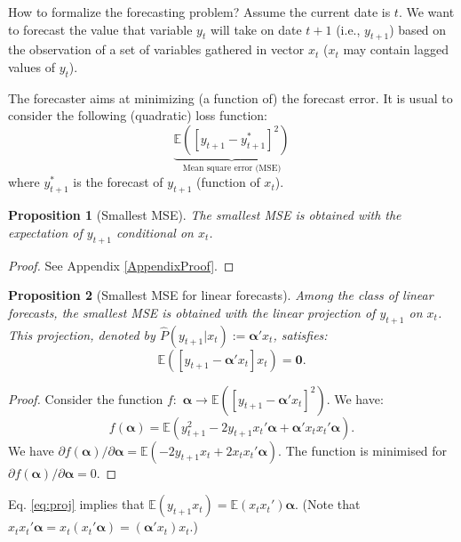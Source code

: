 \documentclass[
  11pt,
]{book}
\newtheorem{proposition}{Proposition}[chapter]
\theoremstyle{definition}
\theoremstyle{definition}
\theoremstyle{definition}
\theoremstyle{definition}
\theoremstyle{remark}
\begin{document}
How to formalize the forecasting problem? Assume the current date is \(t\). We want to forecast the value that variable \(y_t\) will take on date \(t+1\) (i.e., \(y_{t+1}\)) based on the observation of a set of variables gathered in vector \(x_t\) (\(x_t\) may contain lagged values of \(y_t\)).

The forecaster aims at minimizing (a function of) the forecast error. It is usual to consider the following (quadratic) loss function:
\[
\underbrace{\mathbb{E}([y_{t+1} - y^*_{t+1}]^2)}_{\mbox{Mean square error (MSE)}}
\]
where \(y^*_{t+1}\) is the forecast of \(y_{t+1}\) (function of \(x_t\)).

\begin{proposition}[Smallest MSE]
\protect\hypertarget{prp:smallestMSE}{}\label{prp:smallestMSE}The smallest MSE is obtained with the expectation of \(y_{t+1}\) conditional on \(x_t\).
\end{proposition}

\begin{proof}
See Appendix \ref{AppendixProof}.
\end{proof}

\begin{proposition}[Smallest MSE for linear forecasts]
\protect\hypertarget{prp:smallestMSElinear}{}\label{prp:smallestMSElinear}Among the class of linear forecasts, the smallest MSE is obtained with the linear projection of \(y_{t+1}\) on \(x_t\).
This projection, denoted by \(\hat{P}(y_{t+1}|x_t):=\boldsymbol\alpha'x_t\), satisfies:
\begin{equation}
\mathbb{E}\left( [y_{t+1} - \boldsymbol\alpha'x_t]x_t \right)=\mathbf{0}.\label{eq:proj}
\end{equation}
\end{proposition}

\begin{proof}
Consider the function \(f:\) \(\boldsymbol\alpha \rightarrow \mathbb{E}\left( [y_{t+1} - \boldsymbol\alpha'x_t]^2 \right)\). We have:
\[
f(\boldsymbol\alpha) = \mathbb{E}\left( y_{t+1}^2 - 2 y_{t+1} x_t'\boldsymbol\alpha + \boldsymbol\alpha'x_t x_t'\boldsymbol\alpha \right).
\]
We have \(\partial f(\boldsymbol\alpha)/\partial \boldsymbol\alpha = \mathbb{E}(-2 y_{t+1} x_t + 2 x_t x_t'\boldsymbol\alpha)\). The function is minimised for \(\partial f(\boldsymbol\alpha)/\partial \boldsymbol\alpha =0\).
\end{proof}

Eq. \eqref{eq:proj} implies that \(\mathbb{E}\left( y_{t+1}x_t \right)=\mathbb{E}\left(x_tx_t' \right)\boldsymbol\alpha\). (Note that \(x_t x_t'\boldsymbol\alpha=x_t (x_t'\boldsymbol\alpha)=(\boldsymbol\alpha'x_t) x_t\).)
\end{document}
